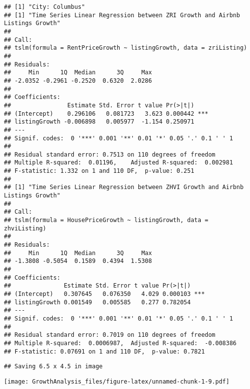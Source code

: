 \documentclass[
]{article}
\begin{document}
\begin{verbatim}
## [1] "City: Columbus"
## [1] "Time Series Linear Regression between ZRI Growth and Airbnb Listings Growth"
## 
## Call:
## tslm(formula = RentPriceGrowth ~ listingGrowth, data = zriListing)
## 
## Residuals:
##     Min      1Q  Median      3Q     Max 
## -2.0352 -0.2961 -0.2520  0.6320  2.0286 
## 
## Coefficients:
##                Estimate Std. Error t value Pr(>|t|)    
## (Intercept)    0.296106   0.081723   3.623 0.000442 ***
## listingGrowth -0.006898   0.005977  -1.154 0.250971    
## ---
## Signif. codes:  0 '***' 0.001 '**' 0.01 '*' 0.05 '.' 0.1 ' ' 1
## 
## Residual standard error: 0.7513 on 110 degrees of freedom
## Multiple R-squared:  0.01196,    Adjusted R-squared:  0.002981 
## F-statistic: 1.332 on 1 and 110 DF,  p-value: 0.251
## 
## [1] "Time Series Linear Regression between ZHVI Growth and Airbnb Listings Growth"
## 
## Call:
## tslm(formula = HousePriceGrowth ~ listingGrowth, data = zhviListing)
## 
## Residuals:
##     Min      1Q  Median      3Q     Max 
## -1.3808 -0.5054  0.1589  0.4394  1.5308 
## 
## Coefficients:
##               Estimate Std. Error t value Pr(>|t|)    
## (Intercept)   0.307645   0.076350   4.029 0.000103 ***
## listingGrowth 0.001549   0.005585   0.277 0.782054    
## ---
## Signif. codes:  0 '***' 0.001 '**' 0.01 '*' 0.05 '.' 0.1 ' ' 1
## 
## Residual standard error: 0.7019 on 110 degrees of freedom
## Multiple R-squared:  0.0006987,  Adjusted R-squared:  -0.008386 
## F-statistic: 0.07691 on 1 and 110 DF,  p-value: 0.7821
\end{verbatim}

\begin{verbatim}
## Saving 6.5 x 4.5 in image
\end{verbatim}

\texttt{[image: GrowthAnalysis\_files/figure-latex/unnamed-chunk-1-9.pdf]}
\end{document}
